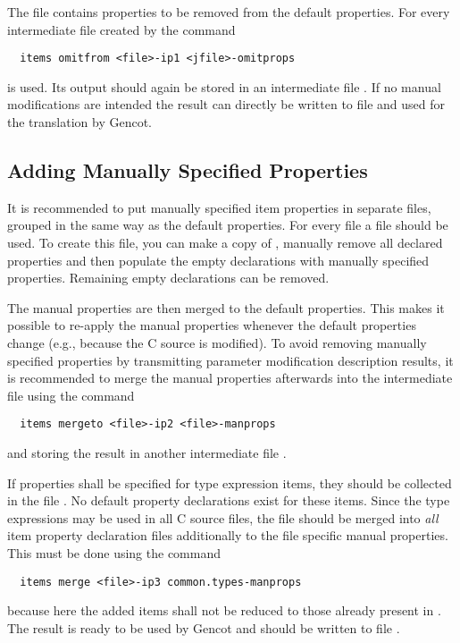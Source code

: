 The file  contains properties to be removed from the default properties. For every intermediate file
 created by  the command 
\begin{verbatim}
  items omitfrom <file>-ip1 <jfile>-omitprops
\end{verbatim}
is used. Its output should again be stored in an intermediate file . If no manual modifications are intended
the result can directly be written to file  and used for the translation by Gencot.

\subsection{Adding Manually Specified Properties}
\label{app-itemprops-manual}

It is recommended to put manually specified item properties in separate files, grouped in the same way as the default 
properties. For every file  a file  should be used. To create this file,
you can make a copy of , manually remove all declared properties and then populate the empty
declarations with manually specified properties. Remaining empty declarations can be removed.

The manual properties are then merged to the default properties. This makes it possible to re-apply the manual properties 
whenever the default properties change (e.g., because the C source is modified). To avoid removing manually specified 
properties by transmitting parameter modification description results, it is recommended to merge the manual properties 
afterwards into the intermediate file  using the command
\begin{verbatim}
  items mergeto <file>-ip2 <file>-manprops
\end{verbatim}
and storing the result in another intermediate file .

If properties shall be specified for type expression items, they should be collected in the file .
No default property declarations exist for these items. Since the type expressions may be used in all C source files, the 
file should be merged into \textit{all} item property declaration files additionally to the file specific manual properties.
This must be done using the command
\begin{verbatim}
  items merge <file>-ip3 common.types-manprops
\end{verbatim}
because here the added items shall not be reduced to those already present in . The result is ready to be used
by Gencot and should be written to file .

